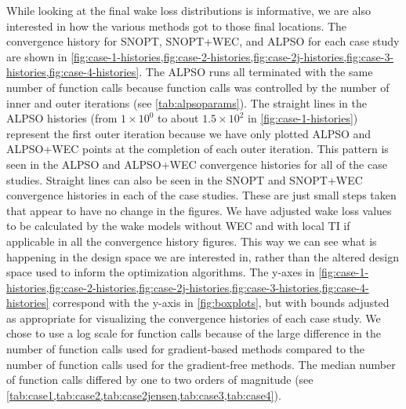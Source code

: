 \documentclass{jpconf}
\begin{document}
While looking at the final wake loss distributions is informative, we are also interested in how the various methods got to those final locations. The convergence history for SNOPT, SNOPT+WEC, and ALPSO for each case study are shown in \cref{fig:case-1-histories,fig:case-2-histories,fig:case-2j-histories,fig:case-3-histories,fig:case-4-histories}. The ALPSO runs all terminated with the same number of function calls because function calls was controlled by the number of inner and outer iterations (see \cref{tab:alpsoparams}). The straight lines in the ALPSO histories (from $1\times10^0$ to about $1.5\times10^2$ in \cref{fig:case-1-histories}) represent the first outer iteration because we have only plotted ALPSO and ALPSO+WEC points at the completion of each outer iteration. This pattern is seen in the ALPSO and ALPSO+WEC convergence histories for all of the case studies. Straight lines can also be seen in the SNOPT and SNOPT+WEC convergence histories in each of the case studies. These are just small steps taken that appear to have no change in the figures. We have adjusted wake loss values to be calculated by the wake models without WEC and with local TI if applicable in all the convergence history figures. This way we can see what is happening in the design space we are interested in, rather than the altered design space used to inform the optimization algorithms. The y-axes in \cref{fig:case-1-histories,fig:case-2-histories,fig:case-2j-histories,fig:case-3-histories,fig:case-4-histories} correspond with the y-axis in \cref{fig:boxplots}, but with bounds adjusted as appropriate for visualizing the convergence histories of each case study. We chose to use a log scale for function calls because of the large difference in the number of function calls used for gradient-based methods compared to the number of function calls used for the gradient-free methods. The median number of function calls differed by one to two orders of magnitude (see \cref{tab:case1,tab:case2,tab:case2jensen,tab:case3,tab:case4}).
\end{document}
